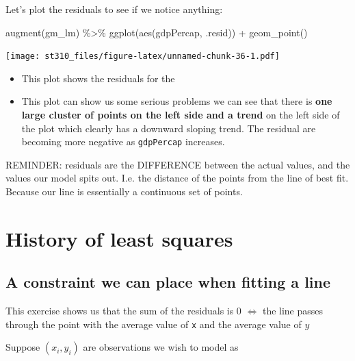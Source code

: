 \documentclass[
]{report}
\newenvironment{Shaded}{\begin{snugshade}}{\end{snugshade}}
\newcommand{\FunctionTok}[1]{\textcolor[rgb]{0.94,0.94,0.56}{#1}}
\newcommand{\NormalTok}[1]{\textcolor[rgb]{0.80,0.80,0.80}{#1}}
\newcommand{\SpecialCharTok}[1]{\textcolor[rgb]{0.86,0.64,0.64}{#1}}
\providecommand{\tightlist}{%
  \setlength{\itemsep}{0pt}\setlength{\parskip}{0pt}}
\renewenvironment{quote}{
	\bigskip\begin{mdframed}[
			skipabove=\topskip,
			skipbelow=\topskip,
			backgroundcolor=quoteshadecolor,
			leftmargin=0.5cm,
			rightmargin=0.5cm,
			topline=false,
			rightline=false,
			bottomline=false,
			nobreak=true,
		]\itshape%
		}{
	\end{mdframed}
}
\renewenvironment{Shaded}{
	\bigskip
	\begin{tcolorbox}[drop fuzzy midday shadow]
		\begin{mdframed}[
				skipabove=\topskip*2,
				outerlinewidth= 0,
				linewidth=0pt,
				roundcorner= 3pt,
				backgroundcolor= shadecolor,
				outerlinecolor= shadecolor,
				innertopmargin= \topskip,
				innerbottommargin=\topskip,
				leftmargin=-0.8cm,
				rightmargin=-0.8cm
			]}{
		\end{mdframed}
	\end{tcolorbox}
	\smallskip
}
\theoremstyle{definition}
\theoremstyle{definition}
\theoremstyle{definition}
\theoremstyle{definition}
\theoremstyle{remark}
\begin{document}
Let's plot the residuals to see if we notice anything:

\begin{Shaded}
\begin{Highlighting}[numbers=left,,]
\FunctionTok{augment}\NormalTok{(gm\_lm) }\SpecialCharTok{\%\textgreater{}\%}
  \FunctionTok{ggplot}\NormalTok{(}\FunctionTok{aes}\NormalTok{(gdpPercap, .resid)) }\SpecialCharTok{+}
  \FunctionTok{geom\_point}\NormalTok{()}
\end{Highlighting}
\end{Shaded}

\texttt{[image: st310\_files/figure-latex/unnamed-chunk-36-1.pdf]}

\begin{itemize}
\tightlist
\item
  This plot shows the residuals for the
\item
  This plot can show us some serious problems we can see that there is \textbf{one
  large cluster of points on the left side and a trend} on the left side of
  the plot which clearly has a downward sloping trend. The residual are
  becoming more negative as \texttt{gdpPercap} increases.
\end{itemize}

\begin{quote}
REMINDER: residuals are the DIFFERENCE between the actual values, and the
values our model spits out. I.e. the distance of the points from the line of
best fit. Because our line is essentially a continuous set of points.
\end{quote}

\hypertarget{history-of-least-squares}{%
\chapter{History of least squares}\label{history-of-least-squares}}

\hypertarget{og-constraint}{%
\section{A constraint we can place when fitting a line}\label{og-constraint}}

\begin{quote}
This exercise shows us that the sum of the residuals is 0 \(\iff\) the line
passes through the point with the average value of \texttt{x} and the average value
of \(y\)
\end{quote}

Suppose \((x_i, y_i)\) are observations we wish to model as
\end{document}
